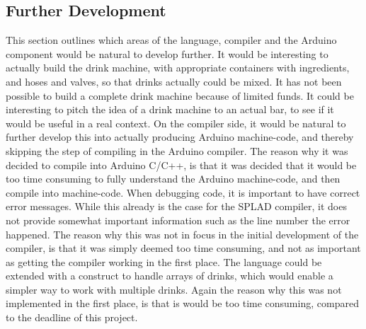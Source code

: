 \subsection{Further Development}
This section outlines which areas of the language, compiler and the Arduino component would be natural to develop further. It would be interesting to actually build the drink machine, with appropriate containers with ingredients, and hoses and valves, so that drinks actually could be mixed. It has not been possible to build a complete drink machine because of limited funds. It could be interesting to pitch the idea of a drink machine to an actual bar, to see if it would be useful in a real context. On the compiler side, it would be natural to further develop this into actually producing Arduino machine-code, and thereby skipping the step of compiling in the Arduino compiler. The reason why it was decided to compile into Arduino C/C++, is that it was decided that it would be too time consuming to fully understand the Arduino machine-code, and then compile into machine-code. When debugging code, it is important to have correct error messages. While this already is the case for the SPLAD compiler, it does not provide somewhat important information such as the line number the error happened. The reason why this was not in focus in the initial development of the compiler, is that it was simply deemed too time consuming, and not as important as getting the compiler working in the first place. The language could be extended with a construct to handle arrays of drinks, which would enable a simpler way to work with multiple drinks. Again the reason why this was not implemented in the first place, is that is would be too time consuming, compared to the deadline of this project. 